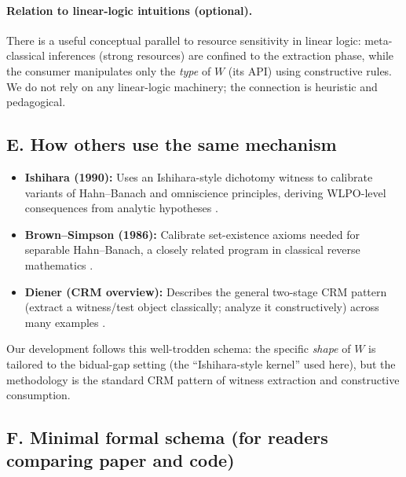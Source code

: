 \documentclass[11pt]{article}
\begin{document}
\paragraph{Relation to linear-logic intuitions (optional).}
There is a useful conceptual parallel to resource sensitivity in linear logic: meta-classical inferences (strong resources) are confined to the extraction phase, while the consumer manipulates only the \emph{type} of $W$ (its API) using constructive rules. We do not rely on any linear-logic machinery; the connection is heuristic and pedagogical.

\subsection*{E. How others use the same mechanism}
\begin{itemize}
\item \textbf{Ishihara (1990):} Uses an Ishihara-style dichotomy witness to calibrate variants of Hahn--Banach and omniscience principles, deriving WLPO-level consequences from analytic hypotheses \cite{Ishihara90}.
\item \textbf{Brown--Simpson (1986):} Calibrate set-existence axioms needed for separable Hahn--Banach, a closely related program in classical reverse mathematics \cite{BrownSimpson86}.
\item \textbf{Diener (CRM overview):} Describes the general two-stage CRM pattern (extract a witness/test object classically; analyze it constructively) across many examples \cite{DienerCRM}.
\end{itemize}

Our development follows this well-trodden schema: the specific \emph{shape} of $W$ is tailored to the bidual-gap setting (the ``Ishihara-style kernel'' used here), but the methodology is the standard CRM pattern of witness extraction and constructive consumption.

\subsection*{F. Minimal formal schema (for readers comparing paper and code)}

\begin{center}
\end{center}
\end{document}

